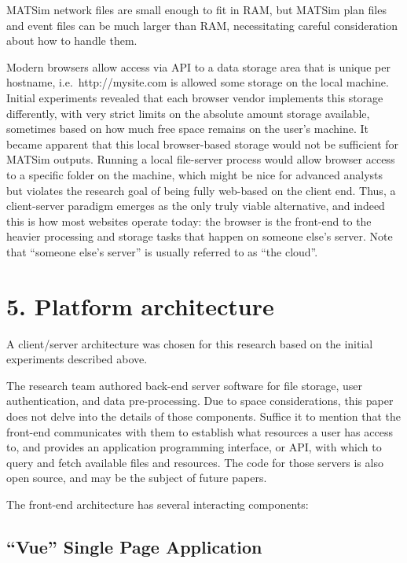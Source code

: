 MATSim network files are small enough to fit in RAM, but MATSim plan files and event files can be much larger than RAM, necessitating careful consideration about how to handle them.

Modern browsers allow access via API to a data storage area that is unique per hostname, i.e.~http://mysite.com is allowed some storage on the local machine. Initial experiments revealed that each browser vendor implements this storage differently, with very strict limits on the absolute amount storage available, sometimes based on how much free space remains on the user's machine. It became apparent that this local browser-based storage would not be sufficient for MATSim outputs. Running a local file-server process would allow browser access to a specific folder on the machine, which might be nice for advanced analysts but violates the research goal of being fully web-based on the client end. Thus, a client-server paradigm emerges as the only truly viable alternative, and indeed this is how most websites operate today: the browser is the front-end to the heavier processing and storage tasks that happen on someone else's server. Note that ``someone else's server'' is usually referred to as ``the cloud''.

\hypertarget{platform-architecture}{%
\section{5. Platform architecture}\label{platform-architecture}}

A client/server architecture was chosen for this research based on the initial experiments described above.

The research team authored back-end server software for file storage, user authentication, and data pre-processing. Due to space considerations, this paper does not delve into the details of those components. Suffice it to mention that the front-end communicates with them to establish what resources a user has access to, and provides an application programming interface, or API, with which to query and fetch available files and resources. The code for those servers is also open source, and may be the subject of future papers.

The front-end architecture has several interacting components:

\hypertarget{vue-single-page-application}{%
\subsection{``Vue'' Single Page
Application}\label{vue-single-page-application}}

